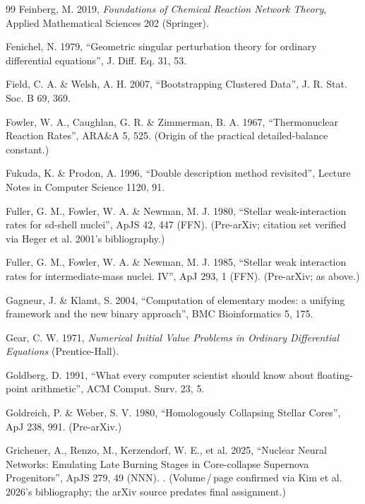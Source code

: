 \begin{thebibliography}{99}
Feinberg, M. 2019, \emph{Foundations of Chemical Reaction Network Theory},
Applied Mathematical Sciences 202 (Springer).

Fenichel, N. 1979, ``Geometric singular perturbation theory for ordinary
differential equations'', J. Diff. Eq. 31, 53.

Field, C. A. \& Welsh, A. H. 2007, ``Bootstrapping Clustered Data'', J. R.
Stat. Soc. B 69, 369.

Fowler, W. A., Caughlan, G. R. \& Zimmerman, B. A. 1967, ``Thermonuclear
Reaction Rates'', ARA\&A 5, 525. (Origin of the practical detailed-balance
constant.)

Fukuda, K. \& Prodon, A. 1996, ``Double description method revisited'', Lecture
Notes in Computer Science 1120, 91.

Fuller, G. M., Fowler, W. A. \& Newman, M. J. 1980, ``Stellar weak-interaction
rates for sd-shell nuclei'', ApJS 42, 447 (FFN). (Pre-arXiv; citation set
verified via Heger et al. 2001's bibliography.)

Fuller, G. M., Fowler, W. A. \& Newman, M. J. 1985, ``Stellar weak interaction
rates for intermediate-mass nuclei. IV'', ApJ 293, 1 (FFN). (Pre-arXiv; as
above.)

Gagneur, J. \& Klamt, S. 2004, ``Computation of elementary modes: a unifying
framework and the new binary approach'', BMC Bioinformatics 5, 175.

Gear, C. W. 1971, \emph{Numerical Initial Value Problems in Ordinary
Differential Equations} (Prentice-Hall).

Goldberg, D. 1991, ``What every computer scientist should know about
floating-point arithmetic'', ACM Comput. Surv. 23, 5.

Goldreich, P. \& Weber, S. V. 1980, ``Homologously Collapsing Stellar Cores'',
ApJ 238, 991. (Pre-arXiv.)

Grichener, A., Renzo, M., Kerzendorf, W. E., et al. 2025, ``Nuclear Neural
Networks: Emulating Late Burning Stages in Core-collapse Supernova
Progenitors'', ApJS 279, 49 (NNN). . (Volume\,/\,page
confirmed via Kim et al. 2026's bibliography; the arXiv source predates final
assignment.)


\end{thebibliography}
